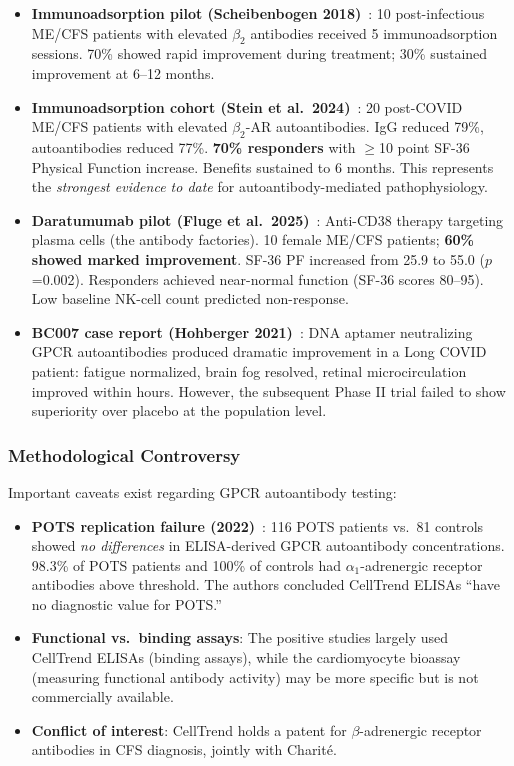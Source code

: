 \begin{itemize}
    \item \textbf{Immunoadsorption pilot (Scheibenbogen 2018)}~\cite{Scheibenbogen2018immunoadsorption}: 10 post-infectious ME/CFS patients with elevated $\beta_2$ antibodies received 5 immunoadsorption sessions. 70\% showed rapid improvement during treatment; 30\% sustained improvement at 6--12 months.
    \item \textbf{Immunoadsorption cohort (Stein et al.\ 2024)}~\cite{Stein2024immunoadsorption}: 20 post-COVID ME/CFS patients with elevated $\beta_2$-AR autoantibodies. IgG reduced 79\%, autoantibodies reduced 77\%. \textbf{70\% responders} with $\geq$10 point SF-36 Physical Function increase. Benefits sustained to 6 months. This represents the \textit{strongest evidence to date} for autoantibody-mediated pathophysiology.
    \item \textbf{Daratumumab pilot (Fluge et al.\ 2025)}~\cite{Fluge2025daratumumab}: Anti-CD38 therapy targeting plasma cells (the antibody factories). 10 female ME/CFS patients; \textbf{60\% showed marked improvement}. SF-36 PF increased from 25.9 to 55.0 ($p$=0.002). Responders achieved near-normal function (SF-36 scores 80--95). Low baseline NK-cell count predicted non-response.
    \item \textbf{BC007 case report (Hohberger 2021)}~\cite{Hohberger2021bc007}: DNA aptamer neutralizing GPCR autoantibodies produced dramatic improvement in a Long COVID patient: fatigue normalized, brain fog resolved, retinal microcirculation improved within hours. However, the subsequent Phase II trial failed to show superiority over placebo at the population level.
\end{itemize}

\subsubsection{Methodological Controversy}

Important caveats exist regarding GPCR autoantibody testing:

\begin{itemize}
    \item \textbf{POTS replication failure (2022)}~\cite{POTS2022failed_replication}: 116 POTS patients vs.\ 81 controls showed \textit{no differences} in ELISA-derived GPCR autoantibody concentrations. 98.3\% of POTS patients and 100\% of controls had $\alpha_1$-adrenergic receptor antibodies above threshold. The authors concluded CellTrend ELISAs ``have no diagnostic value for POTS.''
    \item \textbf{Functional vs.\ binding assays}: The positive studies largely used CellTrend ELISAs (binding assays), while the cardiomyocyte bioassay (measuring functional antibody activity) may be more specific but is not commercially available.
    \item \textbf{Conflict of interest}: CellTrend holds a patent for $\beta$-adrenergic receptor antibodies in CFS diagnosis, jointly with Charité.
\end{itemize}

